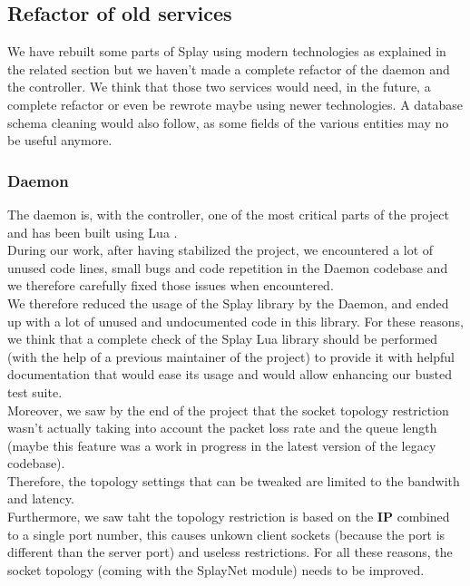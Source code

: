 \documentclass{eplmastersthesis}
\begin{document}
      \subsection{Refactor of old services}

        We have rebuilt some parts of Splay using modern technologies as
        explained in the related section but we haven't made a complete
        refactor of the daemon and the controller. We think that those two
        services would need, in the future, a complete refactor or even be
        rewrote maybe using newer technologies. A database schema cleaning
        would also follow, as some fields of the various entities may no be
        useful anymore.

        \subsubsection{Daemon}

          The daemon is, with the controller, one of the most critical parts of
          the project and has been built using Lua \cite{Lua}.\\
          During our work, after having stabilized the project, we encountered
          a lot of unused code lines, small bugs and code repetition in the
          Daemon codebase and we therefore carefully fixed those issues when
          encountered.\\
          We therefore reduced the usage of the Splay library by the Daemon,
          and ended up with a lot of unused and undocumented code in this
          library. For these reasons, we think that a complete check of the
          Splay Lua library should be performed (with the help of a previous
          maintainer of the project) to provide it with helpful documentation
          that would ease its usage and would allow enhancing our busted test
          suite.\\

          Moreover, we saw by the end of the project that the socket
          topology restriction wasn't actually taking into account
          the packet loss rate and the queue length (maybe this feature was
          a work in progress in the latest version of the legacy codebase).\\
          Therefore, the topology settings that can be tweaked are limited to
          the bandwith and latency.\\
          Furthermore, we saw taht the topology restriction is based on the
          \textbf{IP} combined to a single port number, this causes unkown
          client sockets (because the port is different than the server port)
          and useless restrictions. For all these reasons, the socket topology
          (coming with the SplayNet module) needs to be improved.\\
\end{document}
